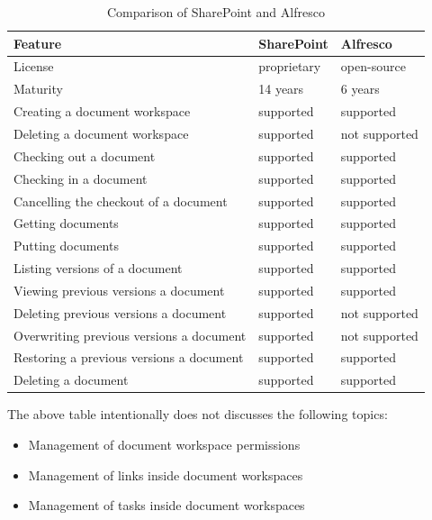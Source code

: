 \begin{table}[H]
  \begin{center}
    \begin{tabular}{| l | l | l |}
    \hline
    \textbf{Feature} & \textbf{SharePoint} & \textbf{Alfresco} \\ \hline
    License & proprietary & open-source \\ \hline
    Maturity & 14 years\cite{sphist} & 6 years \\ \hline
    Creating a document workspace & supported & supported \\ \hline
    Deleting a document workspace & supported & not supported \\ \hline
    Checking out a document & supported & supported \\ \hline
    Checking in a document & supported & supported \\ \hline
    Cancelling the checkout of a document & supported & supported \\ \hline
    Getting documents & supported & supported \\ \hline
    Putting documents & supported & supported \\ \hline
    Listing versions of a document & supported & supported \\ \hline
    Viewing previous versions a document & supported & supported \\ \hline
    Deleting previous versions a document & supported & not supported \\ \hline
    Overwriting previous versions a document & supported & not supported \\ \hline
    Restoring a previous versions a document & supported & supported \\ \hline
    Deleting a document & supported & supported \\ \hline
    \end{tabular}
  \end{center}
  \caption{Comparison of SharePoint and Alfresco}
  \label{tab:background-comparison}
\end{table}

The above table intentionally does not discusses the following topics:

\begin{itemize}
\item Management of document workspace permissions
\item Management of links inside document workspaces
\item Management of tasks inside document workspaces
\end{itemize}

